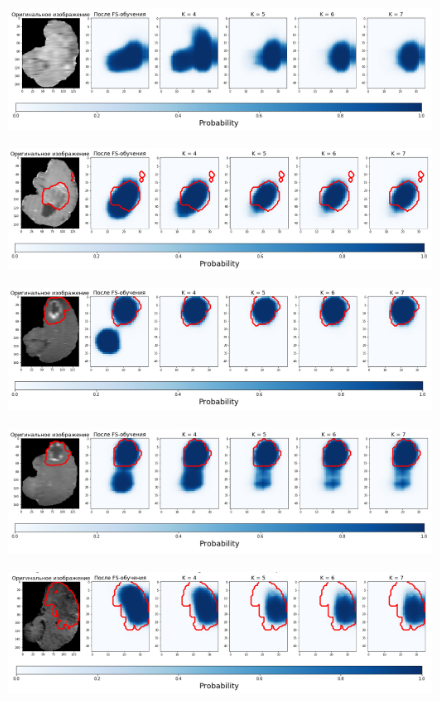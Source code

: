 \begin{figure}[h!] 
  \center
  \includegraphics [scale=0.7] {images/good_9.png}
\end{figure}


\begin{figure}[h!] 
  \center
  \includegraphics [scale=0.7] {images/good_10.png}
\end{figure}

\begin{figure}[h!] 
  \center
  \includegraphics [scale=0.7] {images/good_11.png}
\end{figure}

\begin{figure}[h!] 
  \center
  \includegraphics [scale=0.7] {images/good_12.png}
\end{figure}

\begin{figure}[h!] 
  \center
  \includegraphics [scale=0.7] {images/good_13.png}
\end{figure}

